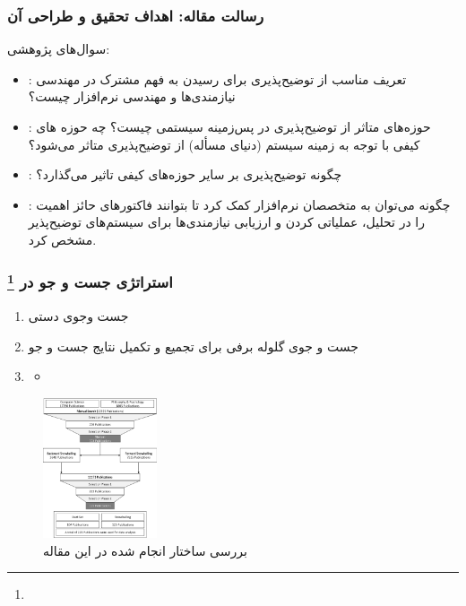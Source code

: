 \documentclass[10pt, a4paper]{beamer}
\begin{document}
\begin{frame}
    \frametitle{رسالت مقاله: اهداف تحقیق و طراحی آن}
    سوال‌های پژوهشی:

    \begin{itemize}
        \item {}: تعریف مناسب از توضیح‌پذیری برای رسیدن به فهم مشترک در مهندسی
        نیازمندی‌ها و مهندسی نرم‌افزار چیست؟
        \item {}: حوزه‌های متاثر از توضیح‌پذیری در پس‌زمینه سیستمی چیست؟ چه
        حوزه های کیفی با توجه به زمینه سیستم (دنیای مسأله) از توضیح‌پذیری متاثر
        می‌شود؟
        \item {}: چگونه توضیح‌پذیری بر سایر حوزه‌های کیفی تاثیر می‌گذارد؟
        \item {}: چگونه می‌توان به متخصصان نرم‌افزار کمک کرد تا بتوانند
        فاکتورهای حائز اهمیت را در تحلیل، عملیاتی کردن و ارزیابی نیازمندی‌ها برای
        سیستم‌های توضیح‌پذیر مشخص کرد.
    \end{itemize}
\end{frame}

\begin{frame}
    \frametitle{استراتژی جست و جو در  \footnote{}}

    \begin{enumerate}
        \item جست وجوی دستی
        \item جست و جوی گلوله برفی برای تجمیع و تکمیل نتایج جست و جو
        \item \begin{itemize}
            \item {}
        \end{itemize}
    \end{enumerate}

    \begin{figure}[H]
        \centering
        \includegraphics[width=0.3\textwidth]{images/slr_order.png}
        \caption{بررسی ساختار  انجام شده در این مقاله}
        \label{fig:slrOrder}
    \end{figure}
\end{frame}
\end{document}
